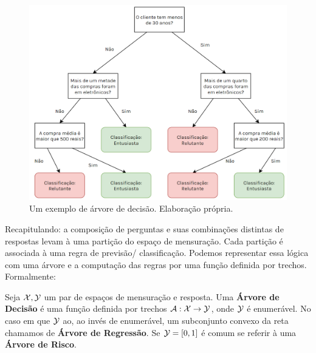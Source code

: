 \begin{figure}
    \centering
    \includegraphics[scale = .55]{imagens/arvore.png}
    \caption{Um exemplo de árvore de decisão. Elaboração própria.}
    \label{fig:arvore}
\end{figure}

Recapitulando: a composição de perguntas e suas combinações distintas de respostas levam à uma partição do espaço de mensuração. Cada partição é associada à uma regra de previsão/ classificação. Podemos representar essa lógica com uma árvore e a computação das regras por uma função definida por trechos. Formalmente:


\begin{defi}
Seja $\mathcal{X}, \mathcal{Y}$ um par de espaços de mensuração e resposta. Uma \textbf{Árvore de Decisão} é uma função definida por trechos $\mathcal{A}: \mathcal{X} \to \mathcal{Y}$, onde $\mathcal{Y}$ é enumerável. No caso em que $\mathcal{Y}$ ao, ao invés de enumerável, um subconjunto convexo da reta chamamos de \textbf{Árvore de Regressão}. Se $\mathcal{Y} = [0, 1]$ é comum se referir à uma \textbf{Árvore de Risco}.
\end{defi}



